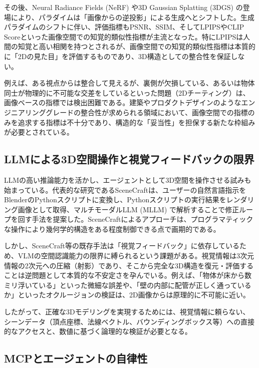 \documentclass[dvipdfmx, a4paper, 9pt]{deimj}
\begin{document}
その後、Neural Radiance Fields (NeRF)\cite{mildenhall2020nerf} や3D Gaussian Splatting (3DGS)\cite{kerbl20233dgs} の登場により、パラダイムは「画像からの逆投影」による生成へとシフトした。生成パラダイムのシフトに伴い、評価指標もPSNR、SSIM、そしてLPIPS\cite{zhang2018lpips}やCLIP Score\cite{radford2021clip}といった画像空間での知覚的類似性指標が主流となった。特にLPIPSは人間の知覚と高い相関を持つとされるが、画像空間での知覚的類似性指標は本質的に「2Dの見た目」を評価するものであり、3D構造としての整合性を保証しない。

例えば、ある視点からは整合して見えるが、裏側が欠損している、あるいは物体同士が物理的に不可能な交差をしているといった問題（2Dチーティング）は、画像ベースの指標では検出困難である\cite{poole2022dreamfusion}。建築やプロダクトデザインのようなエンジニアリンググレードの整合性が求められる領域において、画像空間での指標のみを追求する指標は不十分であり、構造的な「妥当性」を担保する新たな枠組みが必要とされている。

\subsection{LLMによる3D空間操作と視覚フィードバックの限界}

LLMの高い推論能力を活かし、エージェントとして3D空間を操作させる試みも始まっている。代表的な研究であるSceneCraft\cite{hu2024scenecraft}は、ユーザーの自然言語指示をBlenderのPythonスクリプトに変換し、Pythonスクリプトの実行結果をレンダリング画像として取得、マルチモーダルLLM (MLLM) で解析することで修正ループを回す手法を提案した。SceneCraftによるアプローチは、プログラマティックな操作により幾何学的構造をある程度制御できる点で画期的である。

しかし、SceneCraft等の既存手法は「視覚フィードバック」に依存しているため、VLMの空間認識能力の限界に縛られるという課題がある。視覚情報は3次元情報の2次元への圧縮（射影）であり、そこから完全な3D構造を復元・評価することは逆問題として本質的な不安定さを孕んでいる。例えば、「物体が床から数ミリ浮いている」といった微細な誤差や、「壁の内部に配管が正しく通っているか」といったオクルージョンの検証は、2D画像からは原理的に不可能に近い。

したがって、正確な3Dモデリングを実現するためには、視覚情報に頼らない、シーンデータ（頂点座標、法線ベクトル、バウンディングボックス等）への直接的なアクセスと、数値に基づく論理的な検証が必要となる。

\subsection{MCPとエージェントの自律性}
\end{document}
